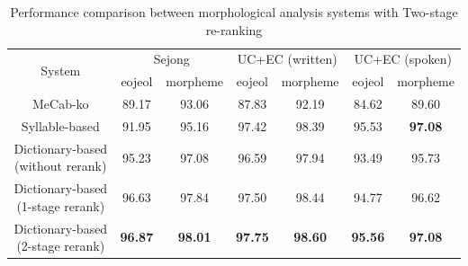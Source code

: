 \documentclass[AMS,STIX2COL]{WileyNJD-v2}
\begin{document}
    \begin{table}[]
        \caption{Performance comparison between morphological analysis systems with Two-stage re-ranking}\label{tab:performance-with-reranking}
        \begin{tabular*}{500pt}{@{\extracolsep\fill}c|cccccc@{\extracolsep\fill}}
            \toprule
            \multirow{2}{*}{System} & \multicolumn{2}{c}{Sejong} & \multicolumn{2}{c}{UC+EC (written)} & \multicolumn{2}{c}{UC+EC (spoken)} \\
            \cmidrule{2-3} \cmidrule{4-5} \cmidrule{6-7}
            & \multicolumn{1}{c}{eojeol} & \multicolumn{1}{c}{morpheme} & \multicolumn{1}{c}{eojeol} & \multicolumn{1}{c}{morpheme} & \multicolumn{1}{c}{eojeol} & \multicolumn{1}{c}{morpheme} \\
            \midrule
            \hspace{2mm}MeCab-ko                          & 89.17                      & 93.06                        & 87.83                      & 92.19                        & 84.62                      & 89.60                        \\
            \hspace{2mm}Syllable-based                    & 91.95                      & 95.16                        & 97.42                      & 98.39                        & 95.53                      & \textbf{97.08}               \\
            \hspace{2mm}Dictionary-based (without rerank) & 95.23                      & 97.08                        & 96.59                      & 97.94                        & 93.49                      & 95.73                        \\
            \hspace{2mm}Dictionary-based (1-stage rerank) & 96.63                      & 97.84                        & 97.50                      & 98.44                        & 94.77                      & 96.62                        \\
            \hspace{2mm}Dictionary-based (2-stage rerank) & \textbf{96.87}             & \textbf{98.01}               & \textbf{97.75}             & \textbf{98.60}               & \textbf{95.56}             & \textbf{97.08}               \\
            \bottomrule
        \end{tabular*}
    \end{table}
\end{document}
